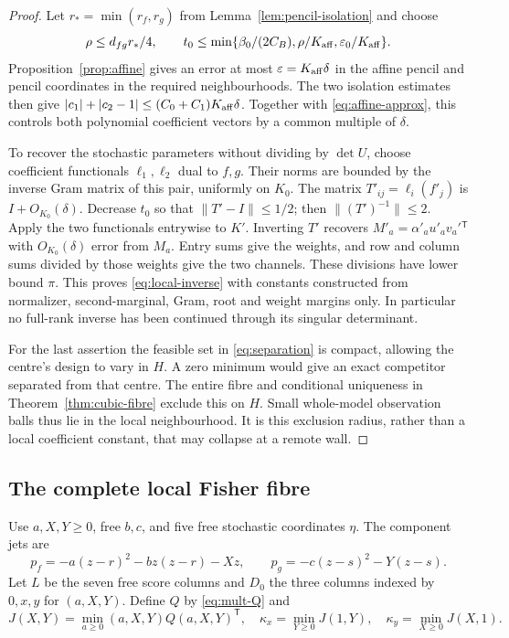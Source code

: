 \begin{proof}
Let $r_* =\min(r_f,r_g)$ from Lemma~\ref{lem:pencil-isolation} and choose
\[
 \rho\le d_{fg}r_*/4,\qquad
 t_0\le\min\{\beta_0/(2C_B),\rho/K_{\rm aff},
                       \varepsilon_0/K_{\rm aff}\}.
\]
Proposition~\ref{prop:affine} gives an error at most
$\varepsilon=K_{\rm aff}\delta$ in the affine pencil and pencil
coordinates in the required neighbourhoods. The two isolation estimates
then give $|c_1|+|c_2-1|\le(C_0+C_1)K_{\rm aff}\delta$.
Together with \eqref{eq:affine-approx}, this controls both polynomial
coefficient vectors by a common multiple of $\delta$.

To recover the stochastic parameters without dividing by $\det U$,
choose coefficient functionals $\ell_1,\ell_2$ dual to $f,g$. Their
norms are bounded by the inverse Gram matrix of this pair, uniformly
on $K_0$. The matrix $T'_{ij}=\ell_i(f'_j)$ is $I+O_{K_0}(\delta)$.
Decrease $t_0$ so that $\|T'-I\|\le1/2$; then $\|(T')^{-1}\|\le2$.
Apply the two functionals entrywise to $K'$. Inverting $T'$ recovers
$M'_a=\alpha'_au'_av_a'{}^{\mathsf T}$ with $O_{K_0}(\delta)$ error
from $M_a$. Entry sums give the weights, and row and column sums divided
by those weights give the two channels. These divisions have lower
bound $\pi$. This proves \eqref{eq:local-inverse} with constants
constructed from normalizer, second-marginal, Gram, root and weight
margins only. In particular no full-rank inverse has been continued
through its singular determinant.

For the last assertion the feasible set in \eqref{eq:separation} is
compact, allowing the centre's design to vary in $H$. A zero minimum
would give an exact competitor separated from that centre. The entire
fibre and conditional uniqueness in Theorem~\ref{thm:cubic-fibre}
exclude this on $H$. Small whole-model observation balls thus lie in
the local neighbourhood. It is this exclusion radius, rather than a
local coefficient constant, that may collapse at a remote wall.
\end{proof}

\subsection{The complete local Fisher fibre}
Use $a,X,Y\ge0$, free $b,c$, and five free stochastic coordinates $\eta$.
The component jets are
\begin{equation}\label{eq:cubic-jets}
 p_f=-a(z-r)^2-bz(z-r)-Xz,\qquad
 p_g=-c(z-s)^2-Y(z-s).
\end{equation}
Let $L$ be the seven free score columns and $D_0$ the three columns
indexed by $0,x,y$ for $(a,X,Y)$. Define $Q$ by \eqref{eq:mult-Q} and
\begin{equation}\label{eq:cubic-kappa}
 J(X,Y)=\min_{a\ge0}(a,X,Y)Q(a,X,Y)^{\mathsf T},\quad
 \kappa_x=\min_{Y\ge0}J(1,Y),\quad
 \kappa_y=\min_{X\ge0}J(X,1).
\end{equation}

